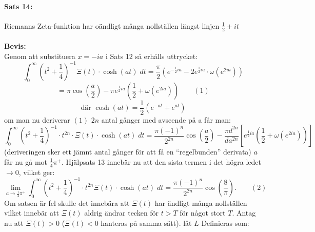 \documentclass[a4paper]{article}%
\begin{document}
\paragraph{Sats 14:} Riemanns Zeta-funktion har oändligt många nollställen längst linjen $\frac 1 2 + it$ \\
\\
{\bf Bevis:} \\
Genom att substituera $x = -ia$ i Sats 12
så erhålls uttrycket:
\[
	\int_0^\infty (t^2 + \frac 1 4)^{-1} \Xi(t) \cdot \cosh(at) \; dt = \frac \pi 2 (e^{- \frac 1 2 ia} - 2 e^{\frac 1 2 ia}
		\cdot \omega(e^{2ia}))
\]
\[
	= \pi \cos(\frac a 2) - \pi e^{\frac 1 2 ia} (\frac 1 2 + \omega(e^{2 ia})) \qquad (1)
\]
\[
	\text{där } \cosh(at) = \frac 1 2 (e^{-at} + e^{at})
\]
om man nu deriverar $(1)$ $2n$ antal gånger med avseende på a får man:
\[
	\int_0^\infty (t^2 + \frac 1 4)^{-1} \cdot t^{2n} \cdot \Xi(t) \cdot \cosh(at) \; dt = \frac {\pi(-1)^n}{2^{2n}}
		\cos(\frac a 2) - \frac {\pi d^{2n}} {da^{2n}} \left [
			e^{\frac 1 2 ia} (\frac 1 2 + \omega(e^{2ia}))
		\right ]
\]
(deriveringen sker ett jämnt antal gånger för att få en ``regelbunden'' derivata)
$a$ får nu gå mot $\frac 1 4 \pi^+$.
Hjälpsats 13 innebär nu att den sista termen i det högra ledet $\to 0$, vilket ger:
\[
	\lim_{a \to \frac 1 4 \pi^+} \int_0^\infty (t^2 + \frac 1 4)^{-1} \cdot t^{2n}\Xi(t) \cdot \cosh(at) \; dt = 
		\frac {\pi (-1)^n} {2^{2n}} \cos(\frac 8 \pi). \qquad (2)
\]
Om satsen är fel skulle det innebära att $\Xi(t)$ har ändligt många nollställen vilket innebär att $\Xi(t)$ aldrig ändrar
tecken för $t > T$ för något stort $T$. Antag nu att $\Xi(t) > 0$ ($\Xi(t) < 0$ hanteras på samma sätt). låt $L$ Definieras som:
\newcommand{\skit} {
	\Xi(t)
}
\end{document}
